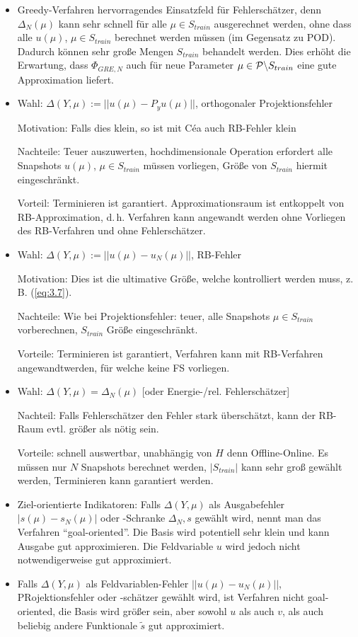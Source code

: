 \begin{bem} \beginwithlistbem
	\begin{itemize}
		\item Greedy-Verfahren hervorragendes Einsatzfeld für Fehlerschätzer, denn $\Delta_N(\mu)$ kann sehr schnell für alle $\mu \in S_{train}$ ausgerechnet werden, ohne dass alle $u(\mu)$, $\mu \in S_{train}$ berechnet werden müssen (im Gegensatz zu POD). Dadurch können sehr große Mengen $S_{train}$ behandelt werden. Dies erhöht die Erwartung, dass $\Phi_{GRE,N}$ auch für neue Parameter $\mu \in \mathcal{P} \backslash S_{train}$ eine gute Approximation liefert.
		\item Wahl: $\Delta(Y,\mu) := ||u(\mu) - P_y u(\mu)||$, orthogonaler Projektionsfehler
		
		Motivation: Falls dies klein, so ist mit Céa auch RB-Fehler klein
		
		Nachteile: Teuer auszuwerten, hochdimensionale Operation erfordert alle Snapshots $u(\mu)$, $\mu \in S_{train}$ müssen vorliegen, Größe von $S_{train}$ hiermit eingeschränkt.
		
		Vorteil: Terminieren ist garantiert. Approximationsraum ist entkoppelt von RB-Approximation, d.\,h. Verfahren kann angewandt werden ohne Vorliegen des RB-Verfahren und ohne Fehlerschätzer.
		\item Wahl: $\Delta(Y,\mu) := ||u(\mu) - u_N(\mu)||$, RB-Fehler
		
		Motivation: Dies ist die ultimative Größe, welche kontrolliert werden muss, z.\,B. (\ref{eq:3.7}).
		
		Nachteile: Wie bei Projektionsfehler: teuer, alle Snapshots $\mu \in S_{train}$ vorberechnen, $S_{train}$ Größe eingeschränkt.
		
		Vorteile: Terminieren ist garantiert, Verfahren kann mit RB-Verfahren angewandtwerden, für welche keine FS vorliegen.
		\item Wahl: $\Delta(Y,\mu) = \Delta_N (\mu)$ [oder Energie-/rel. Fehlerschätzer]
		
		Nachteil: Falls Fehlerschätzer den Fehler stark überschätzt, kann der RB-Raum evtl. größer als nötig sein.
		
		Vorteile: schnell auswertbar, unabhängig von $H$ denn Offline-Online. Es müssen nur $N$ Snapshots berechnet werden, $|S_{train}|$ kann sehr groß gewählt werden, Terminieren kann garantiert werden.
		\item Ziel-orientierte Indikatoren: Falls $\Delta(Y,\mu)$ als Ausgabefehler $|s(\mu) - s_N(\mu)|$ oder -Schranke $\Delta_N,s$ gewählt wird, nennt man das Verfahren ``goal-oriented''. Die Basis wird potentiell sehr klein und kann Ausgabe gut approximieren. Die Feldvariable $u$ wird jedoch nicht notwendigerweise gut approximiert.
		\item Falls $\Delta(Y,\mu)$ als Feldvariablen-Fehler $||u(\mu)-u_N(\mu)||$, PRojektionsfehler oder -schätzer gewählt wird, ist Verfahren nicht goal-oriented, die Basis wird größer sein, aber sowohl $u$ als auch $v$, als auch beliebig andere Funktionale $\tilde{s}$ gut approximiert.
	\end{itemize}
\end{bem}

